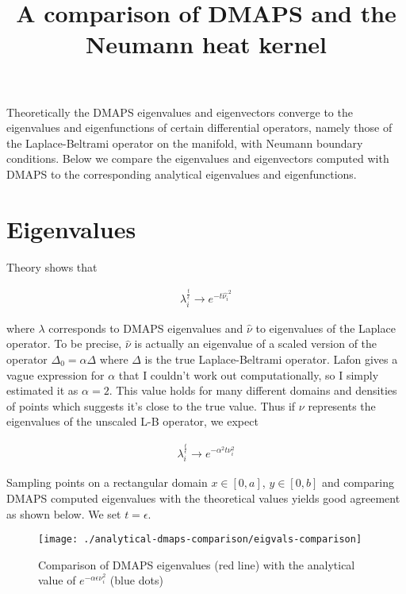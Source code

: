 \documentclass[11pt]{article}
\title{A comparison of DMAPS and the Neumann heat kernel}
\begin{document}
\maketitle

Theoretically the DMAPS eigenvalues and eigenvectors converge to the
eigenvalues and eigenfunctions of certain differential operators,
namely those of the Laplace-Beltrami operator on the manifold, with
Neumann boundary conditions. Below we compare the eigenvalues and
eigenvectors computed with DMAPS to the corresponding analytical
eigenvalues and eigenfunctions.

\section*{Eigenvalues}

Theory shows that

\begin{align*}
  \lambda_i^{\frac{t}{\epsilon}} \rightarrow e^{-t \hat{\nu_i}^2}
\end{align*}

where $\lambda$ corresponds to DMAPS eigenvalues and $\hat{\nu}$ to
eigenvalues of the Laplace operator. To be precise, $\hat{\nu}$ is actually
an eigenvalue of a scaled version of the operator $\Delta_0 = \alpha
\Delta$ where $\Delta$ is the true Laplace-Beltrami operator. Lafon
gives a vague expression for $\alpha$ that I couldn't work out
computationally, so I simply estimated it as $\alpha = 2$. This
value holds for many different domains and densities of points which
suggests it's close to the true value. Thus if $\nu$ represents the
eigenvalues of the unscaled L-B operator, we expect

\begin{align*}
  \lambda_i^{\frac{t}{\epsilon}} \rightarrow e^{-\alpha^2 t \nu_i^2}
\end{align*}

Sampling points on a rectangular domain $x \in [0, a]$, $y \in [0,b]$
and comparing DMAPS computed eigenvalues with the theoretical values
yields good agreement as shown below. We set $t = \epsilon$.

\begin{figure}[htbp]
  \centering
  \texttt{[image: ./analytical-dmaps-comparison/eigvals-comparison]}
  \caption{Comparison of DMAPS eigenvalues (red line) with the
    analytical value of $e^{-\alpha \epsilon \nu_i^2}$ (blue dots)}
\end{figure}
\end{document}
